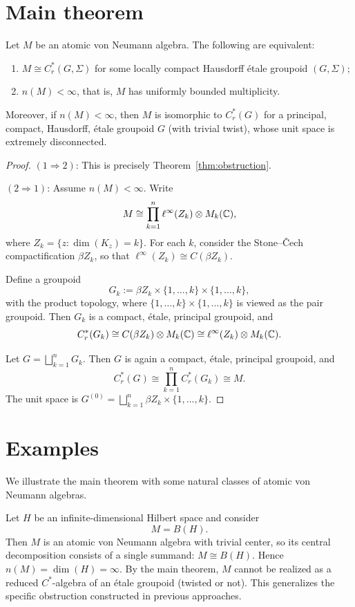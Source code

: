 \section{Main theorem}

\begin{theorem}
Let $M$ be an atomic von Neumann algebra. The following are equivalent:
\begin{enumerate}
\item $M \cong C_r^*(G,\Sigma)$ for some locally compact Hausdorff étale groupoid $(G,\Sigma)$;
\item $n(M) < \infty$, that is, $M$ has uniformly bounded multiplicity.
\end{enumerate}

Moreover, if $n(M) < \infty$, then $M$ is isomorphic to $C_r^*(G)$ for a principal, compact, Hausdorff, étale groupoid $G$ (with trivial twist), whose unit space is extremely disconnected.
\end{theorem}
\begin{proof}
$(1 \Rightarrow 2)$: This is precisely Theorem~\ref{thm:obstruction}.

$(2 \Rightarrow 1)$: Assume $n(M) < \infty$. Write
\[
M \cong \prod_{k=1}^n \ell^\infty(Z_k) \otimes M_k(\mathbb C),
\]
where $Z_k = \{z : \dim(K_z) = k\}$.
For each $k$, consider the Stone--\v{C}ech compactification $\beta Z_k$, so that
$\ell^\infty(Z_k) \cong C(\beta Z_k)$.

Define a groupoid
\[
G_k := \beta Z_k \times \{1,\dots,k\} \times \{1,\dots,k\},
\]
with the product topology, where $\{1,\dots,k\} \times \{1,\dots,k\}$ is viewed as the pair groupoid.
Then $G_k$ is a compact, étale, principal groupoid, and
\[
C_r^*(G_k) \cong C(\beta Z_k) \otimes M_k(\mathbb C) \cong \ell^\infty(Z_k) \otimes M_k(\mathbb C).
\]

Let $G = \bigsqcup_{k=1}^n G_k$. Then $G$ is again a compact, étale, principal groupoid, and
\[
C_r^*(G) \cong \prod_{k=1}^n C_r^*(G_k) \cong M.
\]
The unit space is $G^{(0)} = \bigsqcup_{k=1}^n \beta Z_k \times \{1,\dots,k\}$.
\end{proof}

\section{Examples}

We illustrate the main theorem with some natural classes of atomic von Neumann algebras.

\begin{example}
Let $H$ be an infinite-dimensional Hilbert space and consider
\[
M = B(H).
\]
Then $M$ is an atomic von Neumann algebra with trivial center, so its central decomposition consists of a single summand:
$M \cong B(H)$. Hence $n(M) = \dim(H) = \infty$.
By the main theorem, $M$ cannot be realized as a reduced $C^*$-algebra of an étale groupoid (twisted or not). This generalizes the specific obstruction constructed in previous approaches.
\end{example}

